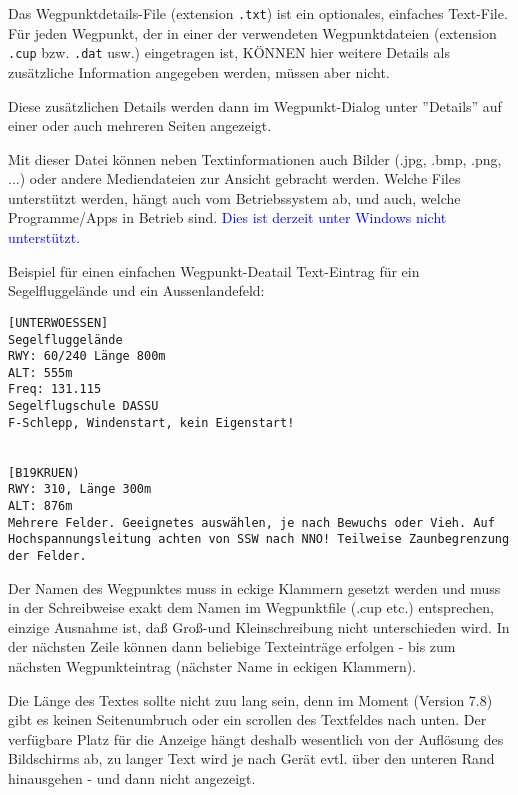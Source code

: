 %
%
%

Das Wegpunktdetails-File (extension \verb|.txt|) ist ein optionales, einfaches Text-File. Für jeden Wegpunkt, der in einer der verwendeten Wegpunktdateien (extension \verb|.cup| bzw. \verb|.dat| usw.) eingetragen ist, KÖNNEN hier weitere Details als zusätzliche Information angegeben werden, müssen aber nicht. 

Diese zusätzlichen Details werden dann im Wegpunkt-Dialog unter ''Details'' auf einer oder auch mehreren Seiten angezeigt.

Mit dieser Datei können neben Textinformationen auch Bilder (.jpg, .bmp, .png, ...) oder andere Mediendateien zur Ansicht gebracht werden. Welche Files unterstützt werden, hängt auch vom Betriebssystem ab, und auch, welche Programme/Apps in Betrieb sind. \textcolor{blue}{Dies ist derzeit unter Windows nicht unterstützt.} 

Beispiel für einen einfachen Wegpunkt-Deatail Text-Eintrag für ein Segelfluggelände und ein
Aussenlandefeld:

\begin{verbatim}
[UNTERWOESSEN]
Segelfluggelände
RWY: 60/240 Länge 800m
ALT: 555m
Freq: 131.115
Segelflugschule DASSU 
F-Schlepp, Windenstart, kein Eigenstart!


[B19KRUEN)
RWY: 310, Länge 300m
ALT: 876m
Mehrere Felder. Geeignetes auswählen, je nach Bewuchs oder Vieh. Auf Hochspannungsleitung achten von SSW nach NNO! Teilweise Zaunbegrenzung der Felder.
\end{verbatim}



Der Namen des Wegpunktes muss in eckige Klammern gesetzt werden und muss in der Schreibweise exakt dem Namen im Wegpunktfile (.cup etc.) entsprechen, einzige Ausnahme ist, daß Groß-und Kleinschreibung nicht unterschieden wird.
In der nächsten Zeile können dann beliebige Texteinträge erfolgen - bis zum nächsten Wegpunkteintrag (nächster Name in eckigen Klammern).

Die Länge des Textes sollte nicht zuu lang sein, denn im Moment (Version 7.8) gibt es keinen Seitenumbruch oder ein scrollen des Textfeldes nach unten. Der verfügbare Platz für die Anzeige hängt deshalb wesentlich von der Auflösung des Bildschirms ab, zu langer Text wird je nach Gerät evtl. über den unteren Rand hinausgehen - und dann nicht angezeigt.

